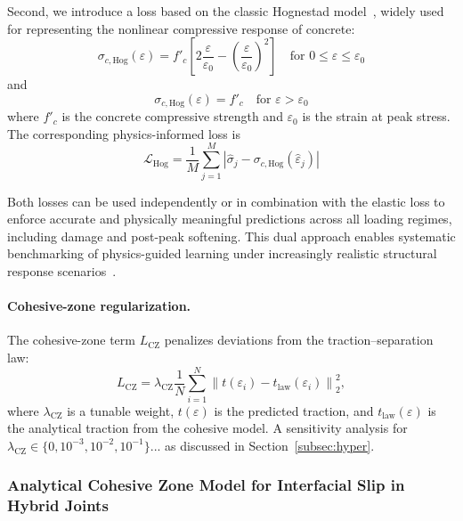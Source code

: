 \documentclass{article}
\begin{document}
Second, we introduce a loss based on the classic Hognestad model~\cite{hognestad1951shear}, widely used for representing the nonlinear compressive response of concrete:
\begin{equation}
\sigma_{c,\mathrm{Hog}}(\varepsilon) = f'_c \left[2 \frac{\varepsilon}{\varepsilon_0} - \left(\frac{\varepsilon}{\varepsilon_0}\right)^2 \right] \quad \text{for } 0 \leq \varepsilon \leq \varepsilon_0
\end{equation}
and
\begin{equation}
\sigma_{c,\mathrm{Hog}}(\varepsilon) = f'_c \quad \text{for } \varepsilon > \varepsilon_0
\end{equation}
where $f'_c$ is the concrete compressive strength and $\varepsilon_0$ is the strain at peak stress. The corresponding physics-informed loss is
\begin{equation}
\mathcal{L}_{\mathrm{Hog}} = \frac{1}{M} \sum_{j=1}^{M} \left| \hat{\sigma}_j - \sigma_{c,\mathrm{Hog}}(\hat{\varepsilon}_j) \right|
\end{equation}

Both losses can be used independently or in combination with the elastic loss to enforce accurate and physically meaningful predictions across all loading regimes, including damage and post-peak softening. This dual approach enables systematic benchmarking of physics-guided learning under increasingly realistic structural response scenarios~\cite{fan2023pinn,Wang2024DamagePINN,chen2023hybrid}.
\paragraph{Cohesive-zone regularization.}
The cohesive-zone term $L_{\mathrm{CZ}}$ penalizes deviations from the traction--separation law:
\begin{equation}
L_{\mathrm{CZ}} = \lambda_{\mathrm{CZ}}\frac{1}{N}\sum_{i=1}^N \left\|t(\varepsilon_i) - t_{\mathrm{law}}(\varepsilon_i)\right\|_2^2,
\end{equation}
where $\lambda_{\mathrm{CZ}}$ is a tunable weight, $t(\varepsilon)$ is the predicted traction, and $t_{\mathrm{law}}(\varepsilon)$ is the analytical traction from the cohesive model.
A sensitivity analysis for $\lambda_{\mathrm{CZ}} \in \{0, 10^{-3}, 10^{-2}, 10^{-1}\}$... as discussed in Section~\ref{subsec:hyper}.


\subsubsection{Analytical Cohesive Zone Model for Interfacial Slip in Hybrid Joints}
\label{subsec:analytical_czm}
\end{document}

